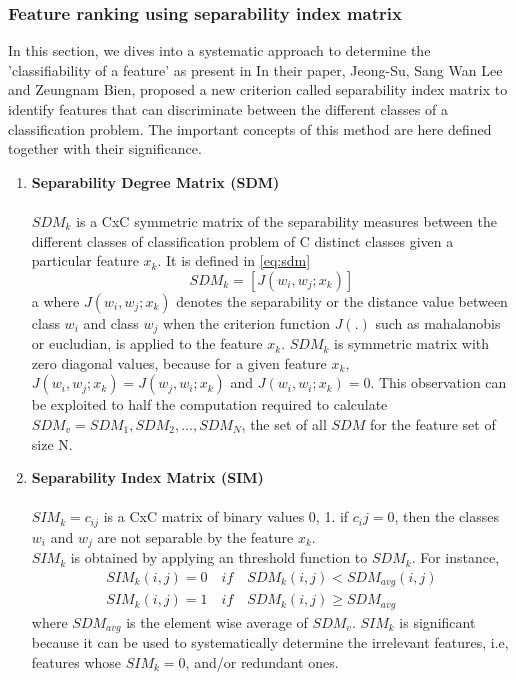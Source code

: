 \subsubsection{Feature ranking using separability index matrix}
In this section, we dives into a systematic approach to determine the 'classifiability of a feature' as present in %
In their paper, Jeong-Su, Sang Wan Lee and Zeungnam Bien, proposed a new criterion called separability index matrix to identify features that can discriminate between the different classes of a classification problem.
The important concepts of this method are here defined together with their significance.

\begin{enumerate}
	\item \textbf{Separability Degree Matrix (SDM)}\\\\
	\(SDM_k\) is a CxC symmetric matrix of the separability measures between the different classes of classification problem of C distinct classes given a particular feature \(x_k\).
	It is defined in \ref{eq:sdm}
\subitem \[SDM_k = [J(w_i, w_j; {x_k})] \label{eq:sdm}\]  a 	
\subitem where \(J(w_i, w_j; {x_k})\) denotes the separability or the distance value between class \(w_i\)  and class \(w_j\) when the criterion function \(J(\textbf{.})\) such as mahalanobis or eucludian, is applied to the feature \(x_k\). %
	\(SDM_k\) is symmetric matrix with zero diagonal values, because for a given feature \(x_k\), \(J(w_i, w_j; {x_k}) = J(w_j, w_i; {x_k})\) and \(J(w_i, w_i; {x_k}) = 0\).
	This observation can be exploited  to half the computation required to calculate \(SDM_v = {SDM_1, SDM_2, ..., SDM_N}\), the set of  all \(SDM\) for the feature set of size N.
	 
	\item \textbf{Separability Index Matrix (SIM)}\\\\
	\(SIM_k = {c_{ij}}\) is a CxC matrix of binary values {0, 1}. if \(c_ij=0\), then the classes \(w_i\) and \(w_j\) are not separable by the feature \(x_k\).\\
	\(SIM_k\) is obtained by applying an threshold function to \(SDM_k\).
	For instance, 
	\begin{align*}
		SIM_k(i, j) = 0 \quad if  \quad SDM_k(i, j) < SDM_{avg}(i, j)\\
		SIM_k(i,j) = 1 \quad if  \quad SDM_k(i,j) \geq SDM_{avg}
	\end{align*}
	where \(SDM_{avg}\) is the element wise average of \(SDM_v\).
	\(SIM_k\) is significant because it can be used to systematically determine the irrelevant features, i.e, features whose \(SIM_k = 0\), and/or redundant ones. %
	

\end{enumerate}
